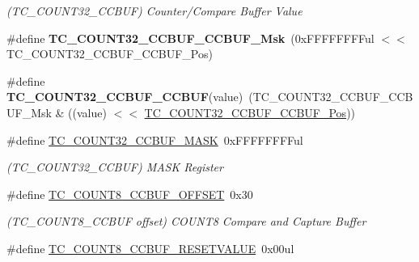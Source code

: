 \begin{DoxyCompactItemize}
\begin{DoxyCompactList}\small\item\em (T\+C\+\_\+\+C\+O\+U\+N\+T32\+\_\+\+C\+C\+B\+U\+F) Counter/\+Compare Buffer Value \end{DoxyCompactList}\item 
\hypertarget{group___s_a_m_l21___t_c_ga11af7fefb0c96bcce39d561fb31ebce1}{}\#define {\bfseries T\+C\+\_\+\+C\+O\+U\+N\+T32\+\_\+\+C\+C\+B\+U\+F\+\_\+\+C\+C\+B\+U\+F\+\_\+\+Msk}~(0x\+F\+F\+F\+F\+F\+F\+F\+Ful $<$$<$ T\+C\+\_\+\+C\+O\+U\+N\+T32\+\_\+\+C\+C\+B\+U\+F\+\_\+\+C\+C\+B\+U\+F\+\_\+\+Pos)\label{group___s_a_m_l21___t_c_ga11af7fefb0c96bcce39d561fb31ebce1}

\item 
\hypertarget{group___s_a_m_l21___t_c_gaded66088b014a8b3b2e791fc0402a4e2}{}\#define {\bfseries T\+C\+\_\+\+C\+O\+U\+N\+T32\+\_\+\+C\+C\+B\+U\+F\+\_\+\+C\+C\+B\+U\+F}(value)~(T\+C\+\_\+\+C\+O\+U\+N\+T32\+\_\+\+C\+C\+B\+U\+F\+\_\+\+C\+C\+B\+U\+F\+\_\+\+Msk \& ((value) $<$$<$ \hyperlink{group___s_a_m_l21___t_c_ga1c70d88b4942aef5ccfb80e76fafc08d}{T\+C\+\_\+\+C\+O\+U\+N\+T32\+\_\+\+C\+C\+B\+U\+F\+\_\+\+C\+C\+B\+U\+F\+\_\+\+Pos}))\label{group___s_a_m_l21___t_c_gaded66088b014a8b3b2e791fc0402a4e2}

\item 
\hypertarget{group___s_a_m_l21___t_c_gac85bc211e41eed62d2be20a48a9e60dc}{}\#define \hyperlink{group___s_a_m_l21___t_c_gac85bc211e41eed62d2be20a48a9e60dc}{T\+C\+\_\+\+C\+O\+U\+N\+T32\+\_\+\+C\+C\+B\+U\+F\+\_\+\+M\+A\+S\+K}~0x\+F\+F\+F\+F\+F\+F\+F\+Ful\label{group___s_a_m_l21___t_c_gac85bc211e41eed62d2be20a48a9e60dc}

\begin{DoxyCompactList}\small\item\em (T\+C\+\_\+\+C\+O\+U\+N\+T32\+\_\+\+C\+C\+B\+U\+F) M\+A\+S\+K Register \end{DoxyCompactList}\item 
\hypertarget{group___s_a_m_l21___t_c_gaab4c33f18a3c80c10b1007cce263dd5d}{}\#define \hyperlink{group___s_a_m_l21___t_c_gaab4c33f18a3c80c10b1007cce263dd5d}{T\+C\+\_\+\+C\+O\+U\+N\+T8\+\_\+\+C\+C\+B\+U\+F\+\_\+\+O\+F\+F\+S\+E\+T}~0x30\label{group___s_a_m_l21___t_c_gaab4c33f18a3c80c10b1007cce263dd5d}

\begin{DoxyCompactList}\small\item\em (T\+C\+\_\+\+C\+O\+U\+N\+T8\+\_\+\+C\+C\+B\+U\+F offset) C\+O\+U\+N\+T8 Compare and Capture Buffer \end{DoxyCompactList}\item 
\hypertarget{group___s_a_m_l21___t_c_ga2940d03b6fffd64e67603678fcca3ad9}{}\#define \hyperlink{group___s_a_m_l21___t_c_ga2940d03b6fffd64e67603678fcca3ad9}{T\+C\+\_\+\+C\+O\+U\+N\+T8\+\_\+\+C\+C\+B\+U\+F\+\_\+\+R\+E\+S\+E\+T\+V\+A\+L\+U\+E}~0x00ul\label{group___s_a_m_l21___t_c_ga2940d03b6fffd64e67603678fcca3ad9}


\end{DoxyCompactItemize}
